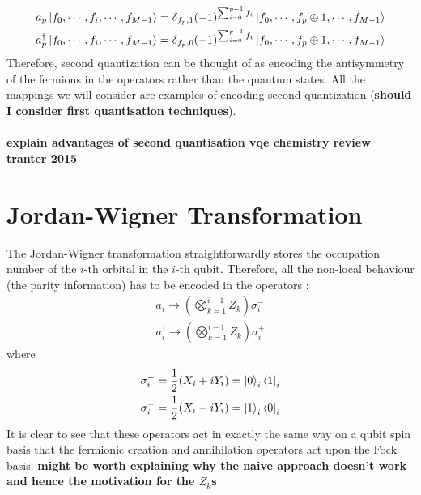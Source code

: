 \documentclass[twoside]{article}
\begin{document}
\begin{equation}
        \label{secondQuant}
        \begin{align}
        a_p \ket{f_0,\cdots, f_i, \cdots, f_{M-1}} = \delta_{f_p, 1} (-1)^{\sum_{i=0}^{p-1} f_i} \ket{f_0,\cdots, f_p \oplus 1, \cdots, f_{M-1}}\\
        a_p^{\dagger} \ket{f_0,\cdots, f_i, \cdots, f_{M-1}} = \delta_{f_p, 0} (-1)^{\sum_{i=0}^{p-1} f_i} \ket{f_0,\cdots, f_p \oplus 1, \cdots, f_{M-1}}
\end{align}
\end{equation}
Therefore, second quantization can be thought of as encoding the antisymmetry of the fermions in the operators rather than the quantum states. All the mappings we will consider are examples of encoding second quantization (\textbf{should I consider first quantisation techniques}).\\\\
\textbf{explain advantages of second quantisation vqe chemistry review tranter 2015}
\section{Jordan-Wigner Transformation}\label{jordan-wigner_section}
The Jordan-Wigner transformation straightforwardly stores the occupation number of the $i$-th orbital in the $i$-th qubit. Therefore, all the non-local behaviour (the parity information) has to be encoded in the operators \cite{fermionicEncoding}:
\begin{equation}
        \begin{align}
        a_i \rightarrow \left( \bigotimes_{k=1}^{i-1} Z_k \right) \sigma_i^-\\
        a^{\dagger}_i \rightarrow \left( \bigotimes_{k=1}^{i-1} Z_k \right) \sigma_i^+
\end{align}
\end{equation}
where
\begin{equation}
        \begin{align}
                \sigma^-_i = \frac{1}{2} (X_i + i Y_i) = \ket{0}_i \bra{1}_i\\
                \sigma^+_i = \frac{1}{2} (X_i - i Y_i) = \ket{1}_i \bra{0}_i 
        \end{align}
\end{equation}
It is clear to see that these operators act in exactly the same way on a qubit spin basis that the fermionic creation and annihilation operators act upon the Fock basis. \textbf{might be worth explaining why the naive approach doesn't work and hence the motivation for the $Z_k$s}
\end{document}
